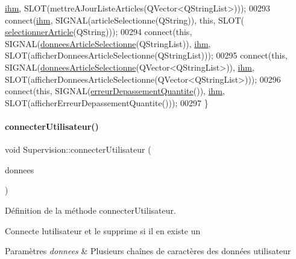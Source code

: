 \begin{DoxyCode}
      \hyperlink{class_supervision_a5aa823c55bf1531497bbb8fdbc6c5528}{ihm}, SLOT(mettreAJourListeArticles(QVector<QStringList>)));
00293     connect(\hyperlink{class_supervision_a5aa823c55bf1531497bbb8fdbc6c5528}{ihm}, SIGNAL(articleSelectionne(QString)), \textcolor{keyword}{this}, SLOT(
      \hyperlink{class_supervision_a2efb7e4dabe2664c9cfd41d703b6250c}{selectionnerArticle}(QString)));
00294     connect(\textcolor{keyword}{this}, SIGNAL(\hyperlink{class_supervision_ae486eafc331964e223c35ae2b54fa669}{donneesArticleSelectionne}(QStringList)), 
      \hyperlink{class_supervision_a5aa823c55bf1531497bbb8fdbc6c5528}{ihm}, SLOT(afficherDonneesArticleSelectionne(QStringList)));
00295     connect(\textcolor{keyword}{this}, SIGNAL(\hyperlink{class_supervision_ae486eafc331964e223c35ae2b54fa669}{donneesArticleSelectionne}(QVector<QStringList>)), 
      \hyperlink{class_supervision_a5aa823c55bf1531497bbb8fdbc6c5528}{ihm}, SLOT(afficherDonneesArticleSelectionne(QVector<QStringList>)));
00296     connect(\textcolor{keyword}{this}, SIGNAL(\hyperlink{class_supervision_a3fb19a3c16324a21af956fd272ca469d}{erreurDepassementQuantite}()), 
      \hyperlink{class_supervision_a5aa823c55bf1531497bbb8fdbc6c5528}{ihm}, SLOT(afficherErreurDepassementQuantite()));
00297 \}
\end{DoxyCode}
\mbox{\label{class_supervision_a7c397ca5f79afa2709a657d7185dfbe1}} 
\paragraph{\texorpdfstring{connecter\+Utilisateur()}{connecterUtilisateur()}}
{\footnotesize\ttfamily void Supervision\+::connecter\+Utilisateur (\begin{DoxyParamCaption}\item[{Q\+String\+List \&}]{donnees }\end{DoxyParamCaption})\hspace{0.3cm}{\ttfamily [private]}}



Définition de la méthode connecter\+Utilisateur. 

Connecte l\textquotesingle{}utilisateur et le supprime si il en existe un 
\begin{DoxyParams}{Paramètres}
{\em donnees} & Plusieurs chaînes de caractères des données utilisateur \\
\hline
\end{DoxyParams}


